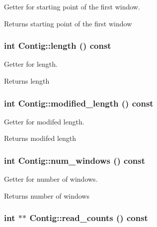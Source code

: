 Getter for starting point of the first window. \begin{DoxyReturn}{Returns}
starting point of the first window 
\end{DoxyReturn}
\hypertarget{classContig_a71da417bc339dbb8e9b13990c2cbb871}{
\subsubsection[{length}]{\setlength{\rightskip}{0pt plus 5cm}int Contig::length () const}}
\label{classContig_a71da417bc339dbb8e9b13990c2cbb871}


Getter for length. \begin{DoxyReturn}{Returns}
length 
\end{DoxyReturn}
\hypertarget{classContig_a578d98d1d77ae2f994b07cfc0db62779}{
\subsubsection[{modified\_\-length}]{\setlength{\rightskip}{0pt plus 5cm}int Contig::modified\_\-length () const}}
\label{classContig_a578d98d1d77ae2f994b07cfc0db62779}


Getter for modifed length. \begin{DoxyReturn}{Returns}
modifed length 
\end{DoxyReturn}
\hypertarget{classContig_a8401c01f72a0d890894feec48e397511}{
\subsubsection[{num\_\-windows}]{\setlength{\rightskip}{0pt plus 5cm}int Contig::num\_\-windows () const}}
\label{classContig_a8401c01f72a0d890894feec48e397511}


Getter for number of windows. \begin{DoxyReturn}{Returns}
number of windows 
\end{DoxyReturn}
\hypertarget{classContig_aea68c04bfd7422be6e11fa6f8ca12804}{
\subsubsection[{read\_\-counts}]{\setlength{\rightskip}{0pt plus 5cm}int $\ast$$\ast$ Contig::read\_\-counts () const}}
\label{classContig_aea68c04bfd7422be6e11fa6f8ca12804}


